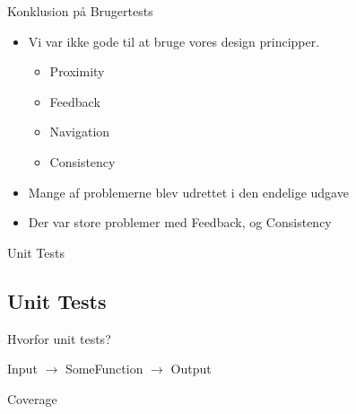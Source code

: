\begin{frame}{Konklusion på Brugertests}	
	
\begin{itemize}
	\item Vi var ikke gode til at bruge vores design principper.
		\begin{itemize}
			\item Proximity
			\item Feedback
			\item Navigation
			\item Consistency
		\end{itemize}
	\item Mange af problemerne blev udrettet i den endelige udgave
	\item Der var store problemer med Feedback, og Consistency
\end{itemize}
  
\end{frame}


\begin{frame}{Unit Tests}
\subsection{Unit Tests}

Hvorfor unit tests?

Input $\rightarrow$ SomeFunction $\rightarrow$  Output

Coverage

\end{frame}

